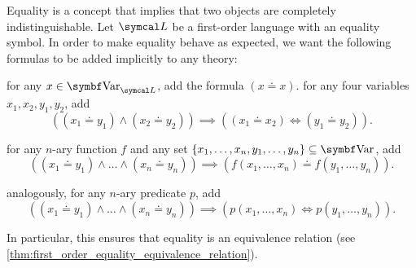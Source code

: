 \begin{remark}\label{remark:first_order_equality}\cite[definition 5.1]{Nerode2012}
  Equality is a concept that implies that two objects are completely indistinguishable. Let \( \Cal{L} \) be a first-order language with an equality symbol. In order to make equality behave as expected, we want the following formulas to be added implicitly to any theory:

  \begin{defenum}
     for any \( x \in \Bold{Var}_{\Cal{L}} \), add the formula \( (x \doteq x) \).
     for any four variables \( x_1, x_2, y_1, y_2 \), add
    \begin{equation*}
      ((x_1 \doteq y_1) \land (x_2 \doteq y_2)) \implies ((x_1 \doteq x_2) \iff (y_1 \doteq y_2)).
    \end{equation*}

     for any \( n \)-ary function \( f \) and any set \( \{ x_1, \ldots, x_n, y_1, \ldots, y_n \} \subseteq \Bold{Var} \), add
    \begin{equation*}
      ((x_1 \doteq y_1) \land \ldots \land (x_n \doteq y_n)) \implies (f(x_1, \ldots, x_n) \doteq f(y_1, \ldots, y_n)).
    \end{equation*}

     analogously, for any \( n \)-ary predicate \( p \), add
    \begin{equation*}
      ((x_1 \doteq y_1) \land \ldots \land (x_n \doteq y_n)) \implies (p(x_1, \ldots, x_n) \iff p(y_1, \ldots, y_n)).
    \end{equation*}
  \end{defenum}

  In particular, this ensures that equality is an equivalence relation (see \cref{thm:first_order_equality_equivalence_relation}).
\end{remark}

